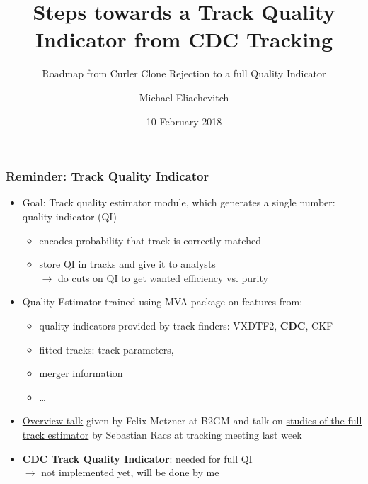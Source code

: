 \documentclass[18pt]{beamer}
\title{Steps towards a Track Quality Indicator from CDC Tracking}
\subtitle{Roadmap from Curler Clone Rejection to a full Quality Indicator}
\author{Michael Eliachevitch}
\date{10 February 2018}
\institute{ETP - KIT}
\begin{document}

\begin{frame}
  \titlepage
\end{frame}

\begin{frame}
  \frametitle{Reminder: Track Quality Indicator}
  \begin{itemize}
  \item Goal: Track quality estimator module, which generates a single number: quality indicator (QI)
    \begin{itemize}
    \item encodes probability that track is correctly matched
    \item store QI in tracks and give it to analysts\\
      $\rightarrow$ do cuts on QI to get wanted efficiency vs. purity
    \end{itemize}
  \item Quality Estimator trained using MVA-package on features from:
    \begin{itemize}
    \item quality indicators provided by track finders: VXDTF2, \textbf{CDC}, CKF
    \item fitted tracks: track parameters, 
    \item merger information
    \item \dots
    \end{itemize}
  \item  \href{https://kds.kek.jp/indico/event/26522/session/10/contribution/75/material/slides/0.pdf}{Overview talk} given by Felix Metzner at B2GM and talk on \href{https://indico.desy.de/indico/event/19869/contribution/14/material/slides/0.pdf}{studies of the full track estimator} by Sebastian Racs at tracking meeting last week
  \item \textbf{CDC Track Quality Indicator}: needed for full QI\\
    $\rightarrow$ not implemented yet, will be done by me
  \end{itemize}
\end{frame}
\end{document}
